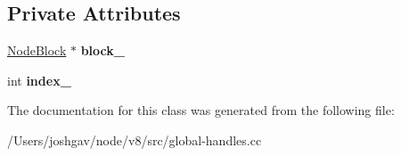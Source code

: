 \subsection*{Private Attributes}
\begin{DoxyCompactItemize}
\item 
\hyperlink{classv8_1_1internal_1_1_global_handles_1_1_node_block}{Node\+Block} $\ast$ {\bfseries block\+\_\+}\hypertarget{classv8_1_1internal_1_1_global_handles_1_1_node_iterator_a2321fc5647703a6956beb4cca41bbfe1}{}\label{classv8_1_1internal_1_1_global_handles_1_1_node_iterator_a2321fc5647703a6956beb4cca41bbfe1}

\item 
int {\bfseries index\+\_\+}\hypertarget{classv8_1_1internal_1_1_global_handles_1_1_node_iterator_a5bde023f8ed03aeb8bb1256a9094e182}{}\label{classv8_1_1internal_1_1_global_handles_1_1_node_iterator_a5bde023f8ed03aeb8bb1256a9094e182}

\end{DoxyCompactItemize}


The documentation for this class was generated from the following file\+:\begin{DoxyCompactItemize}
\item 
/\+Users/joshgav/node/v8/src/global-\/handles.\+cc\end{DoxyCompactItemize}
